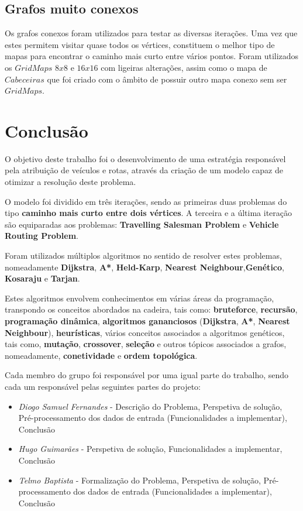 \documentclass[article, a4paper, 12pt, oneside]{memoir}
\begin{document}
\section{Grafos muito conexos}
Os grafos conexos foram utilizados para testar as diversas iterações. Uma vez que estes permitem visitar quase todos os vértices, constituem o melhor tipo
de mapas para encontrar o caminho mais curto entre vários pontos. Foram utilizados os $GridMaps$ $8x8$ e $16x16$ com ligeiras alterações, assim como o mapa de $Cabeceiras$
que foi criado com o âmbito de possuir outro mapa conexo sem ser $GridMaps$.

\newpage
\chapter[Conclusão][Conclusão]{Conclusão} \label{\thechapter}

O objetivo deste trabalho foi o desenvolvimento de uma estratégia responsável pela atribuição de veículos e rotas, através da criação de um modelo capaz de otimizar a resolução deste problema.

O modelo foi dividido em três iterações, sendo as primeiras duas problemas do tipo \textbf{caminho mais curto entre dois vértices}. A terceira e a última iteração são equiparadas aos problemas: \textbf{Travelling Salesman Problem} e \textbf{Vehicle Routing Problem}.

Foram utilizados múltiplos algoritmos no sentido de resolver estes problemas, nomeadamente \textbf{Dijkstra}, \textbf{A*}, \textbf{Held-Karp}, \textbf{Nearest Neighbour},\textbf{Genético}, \textbf{Kosaraju} e \textbf{Tarjan}.

Estes algoritmos envolvem conhecimentos em várias áreas da programação, transpondo os conceitos abordados na cadeira, tais como: \textbf{bruteforce}, \textbf{recursão}, \textbf{programação dinâmica}, \textbf{algoritmos gananciosos} (\textbf{Dijkstra}, \textbf{A*}, \textbf{Nearest Neighbour}), \textbf{heurísticas}, vários conceitos associados a algoritmos genéticos, tais como, \textbf{mutação}, \textbf{crossover}, \textbf{seleção} e outros tópicos associados a grafos, nomeadamente, \textbf{conetividade} e  \textbf{ordem topológica}.

Cada membro do grupo foi responsável por uma igual parte do trabalho, sendo cada um responsável pelas seguintes partes do projeto:
\begin{itemize}
	\item\emph{ Diogo Samuel Fernandes} - Descrição do Problema, Perspetiva de solução, Pré-processamento dos dados de entrada (Funcionalidades a implementar),  Conclusão
	\item\emph{ Hugo Guimarães} -  Perspetiva de solução, Funcionalidades a implementar, Conclusão
	\item\emph{ Telmo Baptista} - Formalização do Problema, Perspetiva de solução, Pré-processamento dos dados de entrada (Funcionalidades a implementar),  Conclusão
\end{itemize}
\end{document}
